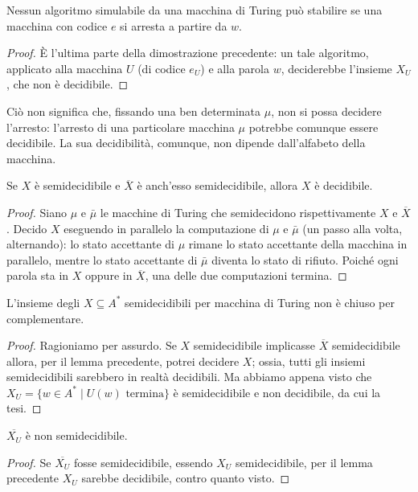 \begin{coro}
Nessun algoritmo simulabile da una macchina di Turing può stabilire se una macchina con codice $e$ si arresta a partire da $w$.
\end{coro}

\begin{proof}
È l'ultima parte della dimostrazione precedente: un tale algoritmo, applicato alla macchina $U$ (di codice $e_U$) e alla parola $w$, deciderebbe l'insieme $X_U$, che non è decidibile.
\end{proof}

Ciò non significa che, fissando una ben determinata $\mu$, non si possa decidere l'arresto: l'arresto di una particolare macchina $\mu$ potrebbe comunque essere decidibile. La sua decidibilità, comunque, non dipende dall'alfabeto della macchina.

\begin{lemm}
Se $X$ è semidecidibile e $\overline X$ è anch'esso semidecidibile, allora $X$ è decidibile.
\end{lemm}

\begin{proof}
Siano $\mu$ e $\bar\mu$ le macchine di Turing che semidecidono rispettivamente $X$ e $\overline X$. Decido $X$ eseguendo in parallelo la computazione di $\mu$ e $\bar\mu$ (un passo alla volta, alternando): lo stato accettante di $\mu$ rimane lo stato accettante della macchina in parallelo, mentre lo stato accettante di $\bar\mu$ diventa lo stato di rifiuto. Poiché ogni parola sta in $X$ oppure in $\overline X$, una delle due computazioni termina.
\end{proof}

\begin{prop}
L'insieme degli $X\subseteq A^*$ semidecidibili per macchina di Turing non è chiuso per complementare.
\end{prop}

\begin{proof}
Ragioniamo per assurdo. Se $X$ semidecidibile implicasse $\overline X$ semidecidibile allora, per il lemma precedente, potrei decidere $X$; ossia, tutti gli insiemi semidecidibili sarebbero in realtà decidibili. Ma abbiamo appena visto che $X_U=\{w\in A^*\mid U(w)\text{ termina}\}$ è semidecidibile e non decidibile, da cui la tesi.
\end{proof}

\begin{coro}
$\overline{X_U}$ è non semidecidibile.
\end{coro}

\begin{proof}
Se $\overline{X_U}$ fosse semidecidibile, essendo $X_U$ semidecidibile, per il lemma precedente $X_U$ sarebbe decidibile, contro quanto visto.
\end{proof}
